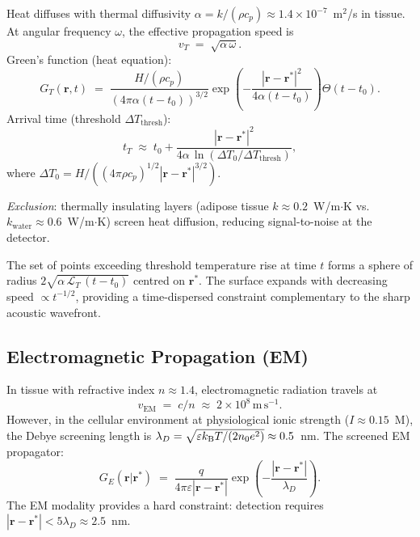 Heat diffuses with thermal diffusivity $\alpha = k/(\rho c_p) \approx 1.4
\times 10^{-7}$~m$^2$/s in tissue.  At angular frequency $\omega$, the
effective propagation speed is
\begin{equation}
  v_T \;=\; \sqrt{\alpha\,\omega}.
  \label{eq:vT}
\end{equation}
Green's function (heat equation):
\begin{equation}
    G_T(\mathbf{r}, t)
    \;=\; \frac{H/(\rho c_p)}{(4\pi\alpha(t-t_0))^{3/2}}
    \exp\!\left(-\frac{|\mathbf{r}-\mathbf{r}^*|^2}{4\alpha(t-t_0)}\right)
    \Theta(t-t_0).
\end{equation}
Arrival time (threshold $\Delta T_\mathrm{thresh}$):
\begin{equation}
    t_T \;\approx\; t_0 + \frac{|\mathbf{r}-\mathbf{r}^*|^2}{4\alpha\,
    \ln(\Delta T_0/\Delta T_\mathrm{thresh})},
    \label{eq:tT}
\end{equation}
where $\Delta T_0 = H/((4\pi\rho c_p)^{1/2}|\mathbf{r}-\mathbf{r}^*|^{3/2})$.

\emph{Exclusion}: thermally insulating layers (adipose tissue
$k \approx 0.2$~W/m$\cdot$K vs.\ $k_\mathrm{water} \approx 0.6$~W/m$\cdot$K)
screen heat diffusion, reducing signal-to-noise at the detector.

\begin{theorem}
\label{thm:diffusive-iso}
The set of points exceeding threshold temperature rise at time $t$ forms a
sphere of radius $2\sqrt{\alpha\,\mathcal{L}_T\,(t-t_0)}$ centred on
$\mathbf{r}^*$.  The surface expands with decreasing speed $\propto t^{-1/2}$,
providing a time-dispersed constraint complementary to the sharp acoustic
wavefront.
\end{theorem}

\subsection{Electromagnetic Propagation (EM)}

In tissue with refractive index $n \approx 1.4$, electromagnetic radiation
travels at
\begin{equation}
  v_{\mathrm{EM}} \;=\; c/n \;\approx\; 2 \times 10^{8}\,\mathrm{m\,s^{-1}}.
  \label{eq:vEM}
\end{equation}
However, in the cellular environment at physiological ionic strength
($I \approx 0.15$~M), the Debye screening length is
$\lambda_D = \sqrt{\varepsilon k_{\mathrm{B}} T/(2n_0 e^2)} \approx 0.5$~nm.  The
screened EM propagator:
\begin{equation}
    G_E(\mathbf{r}|\mathbf{r}^*)
    \;=\; \frac{q}{4\pi\varepsilon|\mathbf{r}-\mathbf{r}^*|}
    \exp\!\left(-\frac{|\mathbf{r}-\mathbf{r}^*|}{\lambda_D}\right).
\end{equation}
The EM modality provides a hard constraint: detection requires
$|\mathbf{r}-\mathbf{r}^*| < 5\lambda_D \approx 2.5$~nm.

